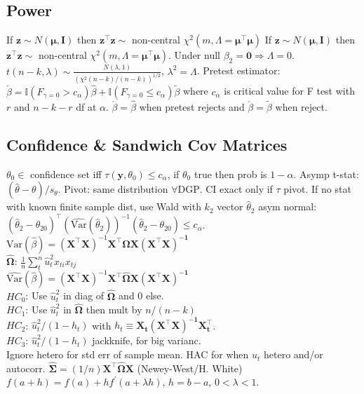 \subsection*{Power}
If $\mathbf{z} \sim N(\mathbf{\mu, I})$ then $\mathbf{z^{\top}z} \sim$ non-central $\chi^2(m,\Lambda = \mathbf{\mu^{\top}\mu})$ If $\mathbf{z} \sim N(\mathbf{\mu, I})$ then $\mathbf{z^{\top}z} \sim$ non-central $\chi^2(m,\Lambda = \mathbf{\mu^{\top}\mu})$.
Under null $\beta_2 = \mathbf{0} \Rightarrow \Lambda = 0$.\\
$t(n-k,\lambda) \sim \frac{N(\lambda, 1)}{(\chi^2(n-k)/(n-k))^{1/2}}$, $\lambda^2 = \Lambda$.
Pretest estimator: $\acute{\beta} = \mathbb{I}(F_{\gamma = 0} > c_\alpha)\hat{\beta} + \mathbb{I}(F_{\gamma=0} \leq c_\alpha)\tilde{\beta}$ where $c_{\alpha}$ is critical value for F test with $r$ and $n-k-r$ df at $\alpha$.
$\acute{\beta} = \hat{\beta}$ when pretest rejects and $\acute{\beta} = \tilde{\beta}$ when reject.
\subsection*{Confidence \& Sandwich Cov Matrices}
$\theta_0 \in $ confidence set iff $\tau(\mathbf{y}, \theta_0) \leq c_{\alpha}$, if $\theta_0$ true then prob is $1-\alpha$.
Asymp t-stat: $(\hat{\theta}-\theta)/s_{\theta}$.
Pivot: same distribution $\forall \text{DGP}$.
CI exact only if $\tau$ pivot.
If no stat with known finite sample dist, use Wald with $k_2$ vector $\hat{\theta}_2$ asym normal: $(\hat{\theta}_2 - \theta_{20})^{\top}(\widehat{\text{Var}}(\hat{\theta}_2))^{-1}(\hat{\theta}_2 - \theta_{20}) \leq c_{\alpha}$.
$\text{Var}(\hat{\beta}) = (\mathbf{X^{\top}X})^{-1} \mathbf{X}^{\top}\mathbf{\Omega}\mathbf{X(X^{\top}X)^{-1}}$\\
$\hat{\mathbf{\Omega}}$: $\frac{1}{n} \sum_{t}^{n} \hat{u}_t ^2 x_{ti} x_{tj}$\\
$\widehat{\text{Var}}(\hat{\beta}) = (\mathbf{X^{\top}X})^{-1} \mathbf{X}^{\top}\mathbf{\hat{\Omega}}\mathbf{X(X^{\top}X)^{-1}}$\\
$HC_0$: Use $\hat{u}_t ^2$ in diag of $\mathbf{\hat{\Omega}}$ and 0 else.\\
$HC_1$: Use $\hat{u}_t ^2$ in $\mathbf{\hat{\Omega}}$ then mult by $n / (n-k)$\\
$HC_2$: $\hat{u}_t ^2 / (1-h_t)$ with $h_t \equiv \mathbf{X_t(X^{\top}X)^{-1}X_t ^{\top}}$.\\
$HC_3$: $\hat{u}_t ^2 / (1-h_t)$ jackknife, for big varianc.\\
Ignore hetero for std err of sample mean.
HAC for when $u_t$ hetero and/or autocorr.
$\mathbf{\hat{\Sigma}} = (1 / n) \mathbf{X^{\top}\hat{\Omega}X}$ (Newey-West/H. White)\\
$f(a+h) = f(a) + hf^{\prime}(a+\lambda h)$, $h=b-a$, $0<\lambda <1$.
